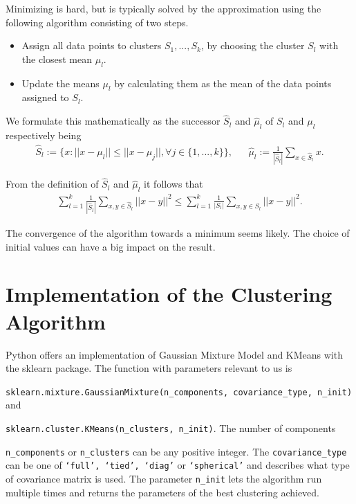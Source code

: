Minimizing is hard, but is typically solved by the approximation using the following algorithm consisting of two steps.

\begin{itemize}
	\item Assign all data points to clusters $S_1, ..., S_k$, by choosing the cluster $S_l$ with the closest mean $\mu_l$.
	\item Update the means $\mu_l$ by calculating them as the mean of the data points assigned to $S_l$.
\end{itemize}

We formulate this mathematically as the successor $\hat{S}_l$ and $\hat{\mu}_l$ of $S_l$ and $\mu_l$ respectively being
\begin{align*}
	\hat{S}_l := \{x: ||x-\mu_l|| \leq ||x-\mu_j||, \forall j \in \{1, ..., k\} \}, &&
	\hat{\mu}_l := \frac{1}{|\hat{S}_l|} \sum_{x \in \hat{S}_l} x.
\end{align*}

From the definition of $\hat{S}_l$ and $\hat{\mu}_l$ it follows that
\begin{align*}
	\sum_{l=1}^{k} \frac{1}{|\hat{S}_l|} \sum_{x, y \in \hat{S}_l} ||x-y||^2 \leq \sum_{l=1}^{k} \frac{1}{|S_l|} \sum_{x, y \in S_l} ||x-y||^2.
\end{align*}

The convergence of the algorithm towards a minimum seems likely. The choice of initial values can have a big impact on the result.

\section{Implementation of the Clustering Algorithm}

Python offers an implementation of Gaussian Mixture Model and KMeans with the sklearn package. The function with parameters relevant to us is

\noindent
\texttt{sklearn.mixture.GaussianMixture(n\_components, covariance\_type, n\_init)} and

\noindent
\texttt{sklearn.cluster.KMeans(n\_clusters, n\_init)}. The number of components

\noindent
\texttt{n\_components} or \texttt{n\_clusters} can be any positive integer. The \texttt{covariance\_type} can be one of \texttt{‘full’, ‘tied’, ‘diag’} or \texttt{‘spherical’} and describes what type of covariance matrix is used. The parameter \texttt{n\_init} lets the algorithm run multiple times and returns the parameters of the best clustering achieved.

